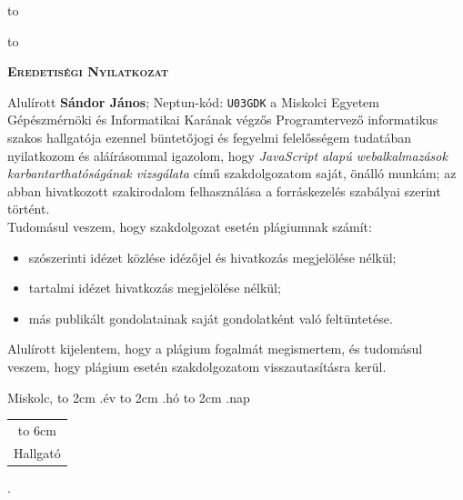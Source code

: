 \vskip 2cm

\hbox to 

\hbox to 

\newpage

\vspace*{1cm}  
\begin{center}
\large\textsc{\bfseries Eredetiségi Nyilatkozat}
\end{center}
\vspace*{2cm}  

Alulírott \textbf{Sándor János}; Neptun-kód: \texttt{U03GDK} a Miskolci Egyetem Gépészmérnöki és Informatikai Karának végzős Programtervező informatikus szakos hallgatója ezennel büntetőjogi és fegyelmi felelősségem tudatában nyilatkozom és aláírásommal igazolom, hogy \textit{JavaScript alapú webalkalmazások karbantarthatóságának vizsgálata}
című szakdolgozatom saját, önálló munkám; az abban hivatkozott szakirodalom
felhasználása a forráskezelés szabályai szerint történt.\\

Tudomásul veszem, hogy szakdolgozat esetén plágiumnak számít:
\begin{itemize}
\item szószerinti idézet közlése idézőjel és hivatkozás megjelölése nélkül;
\item tartalmi idézet hivatkozás megjelölése nélkül;
\item más publikált gondolatainak saját gondolatként való feltüntetése.
\end{itemize}

Alulírott kijelentem, hogy a plágium fogalmát megismertem, és tudomásul veszem, hogy
plágium esetén szakdolgozatom visszautasításra kerül.

\vspace*{3cm}

\noindent Miskolc, \hbox to 2cm{\dotfill} .év \hbox to 2cm{\dotfill} .hó \hbox to 2cm{\dotfill} .nap

\vspace*{3cm}

\hspace*{8cm}\begin{tabular}{c}
\hbox to 6cm{\dotfill}\\
Hallgató
\end{tabular}



\newpage

.

